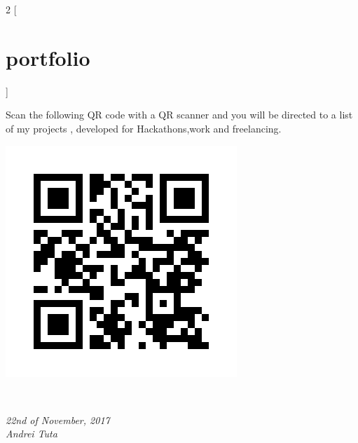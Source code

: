 \documentclass[]{friggeri-cv}
\begin{document}
\begin{multicols}{2}
[
\section{portfolio}
]

Scan the following QR code with a QR scanner and you will be directed to a list of my projects , developed for Hackathons,work and freelancing.
    
   \begin{flushright}
   \includegraphics[scale=0.30]{img/static_qr_code_without_logo.jpg}
\end{flushright}

   
\end{multicols}
\\
\begin{flushleft}
\emph{22nd of November, 2017}
\\
\emph{Andrei Tuta}
\end{flushleft}
\end{document}
